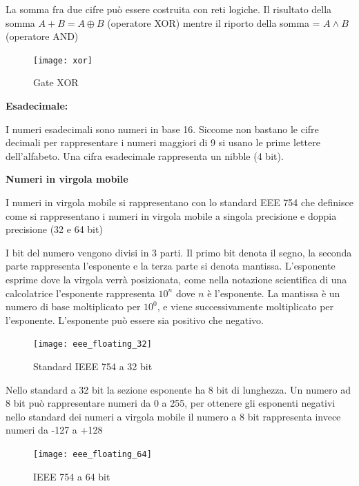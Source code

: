 La somma fra due cifre può essere costruita con reti logiche. Il risultato della somma $ A + B = A \oplus B $ (operatore XOR) mentre il riporto della somma = $ A \land B $ (operatore AND)

\begin{figure}
	\centering
	\caption{Gate XOR}
	\texttt{[image: xor]}
\end{figure}

\begin{defn}
	\textbf{Esadecimale:} 
	
	I numeri esadecimali sono numeri in base 16. Siccome non bastano le cifre decimali per rappresentare i numeri maggiori di 9 si usano le prime lettere dell'alfabeto.
	Una cifra esadecimale rappresenta un nibble (4 bit).
\end{defn}

\begin{defn}
	\textbf{Numeri in virgola mobile}
	
	I numeri in virgola mobile si rappresentano con lo standard EEE 754 che definisce come si rappresentano i numeri in virgola mobile a singola precisione e doppia precisione (32 e 64 bit)
	
	I bit del numero vengono divisi in 3 parti. Il primo bit denota il segno, la seconda parte rappresenta l'esponente e la terza parte si denota mantissa. L'esponente esprime dove la virgola verrà posizionata, come nella notazione scientifica di una calcolatrice l'esponente rappresenta $ 10^{n} $ dove $ n $ è l'esponente. La mantissa è un numero di base moltiplicato per $ 10^0 $, e viene successivamente moltiplicato per l'esponente.
	L'esponente può essere sia positivo che negativo.
	
	\begin{figure}
		\caption{Standard IEEE 754 a 32 bit}
		\texttt{[image: eee\_floating\_32]}
	\end{figure}
	
	Nello standard a 32 bit la sezione esponente ha 8 bit di lunghezza. Un numero ad 8 bit può rappresentare numeri da 0 a 255, per ottenere gli esponenti negativi nello standard dei numeri a virgola mobile il numero a 8 bit rappresenta invece numeri da -127 a +128
	
	\begin{figure}
		\caption{IEEE 754 a 64 bit}
		\texttt{[image: eee\_floating\_64]}
	\end{figure}
\end{defn}



